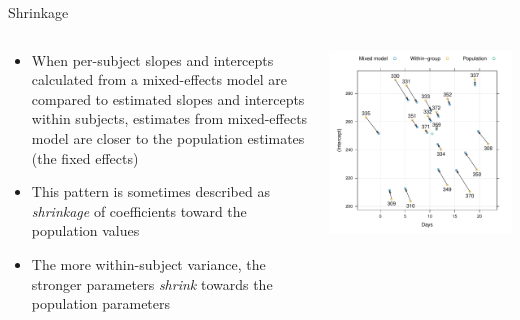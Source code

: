 \documentclass[aspectratio=169]{beamer}
\begin{document}
\begin{frame}{Shrinkage}
  \begin{columns}
    \begin{column}{.5\textwidth}
  \begin{itemize}
    \item When per-subject slopes and intercepts calculated from a
      mixed-effects model are compared to estimated slopes and intercepts
      within subjects, estimates from mixed-effects model are
      closer to the population estimates (the fixed effects)
    \item This pattern is sometimes described as {\it shrinkage} of
      coefficients toward the population values
    \item The more within-subject variance, the stronger parameters {\it shrink}
      towards the population parameters
  \end{itemize}
    \end{column}
    \begin{column}{.5\textwidth}
    \includegraphics[scale=.48]{../figures/sleep_shrinkage}
    \end{column}
  \end{columns}
\end{frame}
\end{document}
